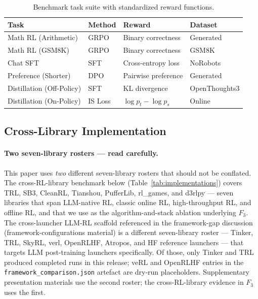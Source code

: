 \documentclass{article}
\begin{document}
\begin{table}[htbp]
\centering
\caption{Benchmark task suite with standardized reward functions.}
\label{tab:tasks}
\begin{tabular}{llll}
\toprule
\textbf{Task} & \textbf{Method} & \textbf{Reward} & \textbf{Dataset} \\
\midrule
Math RL (Arithmetic) & GRPO & Binary correctness & Generated \\
Math RL (GSM8K) & GRPO & Binary correctness & GSM8K \\
Chat SFT & SFT & Cross-entropy loss & NoRobots \\
Preference (Shorter) & DPO & Pairwise preference & Generated \\
Distillation (Off-Policy) & SFT & KL divergence & OpenThoughts3 \\
Distillation (On-Policy) & IS Loss & $\log p_t - \log p_s$ & Online \\
\bottomrule
\end{tabular}
\end{table}

\subsection{Cross-Library Implementation}

\paragraph{Two seven-library rosters --- read carefully.}
This paper uses \emph{two} different seven-library rosters that
should not be conflated. The cross-RL-library benchmark below
(Table~\ref{tab:implementations}) covers TRL, SB3, CleanRL, Tianshou,
PufferLib, rl\_games, and d3rlpy --- seven libraries that span
LLM-native RL, classic online RL, high-throughput RL, and offline RL,
and that we use as the algorithm-and-stack ablation underlying $F_3$.
The cross-launcher LLM-RL scaffold referenced in the framework-gap
discussion (framework-configurations material) is a different seven-library
roster --- Tinker, TRL, SkyRL, verl, OpenRLHF, Atropos, and HF
reference launchers --- that targets LLM post-training launchers
specifically. Of those, only Tinker and TRL produced completed
runs in this release; veRL and OpenRLHF entries in the
\texttt{framework\_comparison.json} artefact are dry-run
placeholders. Supplementary presentation materials use the second roster; the
cross-RL-library evidence in $F_3$ uses the first.
\end{document}
